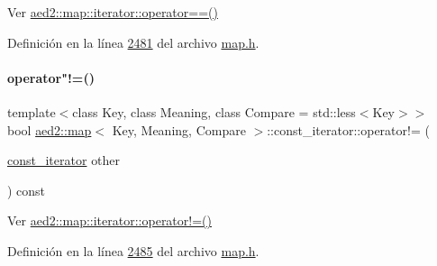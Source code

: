 Ver \hyperlink{classaed2_1_1map_1_1iterator_a34f6622845af93ca42f1be8516eeafa2_a34f6622845af93ca42f1be8516eeafa2}{aed2\+::map\+::iterator\+::operator==()} 



Definición en la línea \hyperlink{map_8h_source_l02481}{2481} del archivo \hyperlink{map_8h_source}{map.\+h}.

\mbox{\label{classaed2_1_1map_1_1const__iterator_aeb4721e5da865908c541f2a77a2ffab2_aeb4721e5da865908c541f2a77a2ffab2}} 
\paragraph{\texorpdfstring{operator"!=()}{operator!=()}}
{\footnotesize\ttfamily template$<$class Key, class Meaning, class Compare = std\+::less$<$\+Key$>$$>$ \\
bool \hyperlink{classaed2_1_1map}{aed2\+::map}$<$ Key, Meaning, Compare $>$\+::const\+\_\+iterator\+::operator!= (\begin{DoxyParamCaption}\item[{\hyperlink{classaed2_1_1map_1_1const__iterator}{const\+\_\+iterator}}]{other }\end{DoxyParamCaption}) const\hspace{0.3cm}{\ttfamily [inline]}}



Ver \hyperlink{classaed2_1_1map_1_1iterator_a748cdf8c35707d1c2e9ef8ef9d862d37_a748cdf8c35707d1c2e9ef8ef9d862d37}{aed2\+::map\+::iterator\+::operator!=()} 



Definición en la línea \hyperlink{map_8h_source_l02485}{2485} del archivo \hyperlink{map_8h_source}{map.\+h}.

\mbox{\label{classaed2_1_1map_1_1const__iterator_ab408eb7252948dd8b8df540303ab5906_ab408eb7252948dd8b8df540303ab5906}} 
